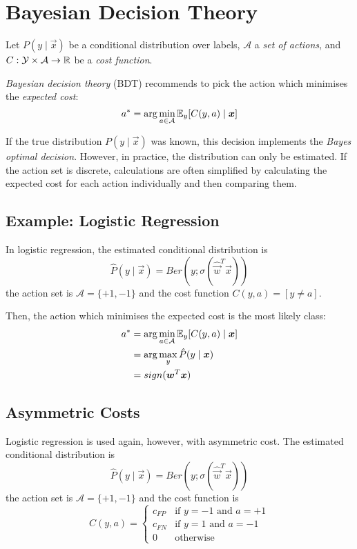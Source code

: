 \section{Bayesian Decision Theory}
Let $P(y \mid \vec{x})$ be a conditional
distribution over labels,
$\mathcal{A}$ a \emph{set of actions},
and $C : \mathcal{Y} \times \mathcal{A} \to \mathbb{R}$
be a \emph{cost function}.

\emph{Bayesian decision theory} (BDT)
recommends to
pick the action which minimises the
\emph{expected cost}:
\begin{equation*}
    a^* =
    \arg\min_{a \in \mathcal{A}}{
        \mathbb{E}_y[C(y, a) \mid \boldsymbol{x}]
    }
\end{equation*}

If the true distribution $P(y \mid \vec{x})$
was known, this decision implements the
\emph{Bayes optimal decision}.
However, in practice, the distribution
can only be estimated.
If the action set is discrete,
calculations are often simplified
by calculating the expected cost
for each action individually
and then comparing them.


\subsection{Example: Logistic Regression}
In logistic regression,
the estimated conditional distribution is
\begin{equation*}
    \hat{P}(y \mid \vec{x}) =
    Ber(y ; \sigma(\hat{\vec{w}}^T \vec{x}))
\end{equation*}
the action set is
$\mathcal{A} = \{+1, -1\}$ and
the cost function
$C(y, a) = [y \neq a]$.

Then, the action which minimises the
expected cost is the most likely class:
\begin{align*}
    a^* &=
    \arg\min_{a \in \mathcal{A}}{
        \mathbb{E}_y[C(y, a) \mid \boldsymbol{x}]
    } \\
    &= \arg\max_y{\hat{P}(y \mid \boldsymbol{x})} \\
    &= sign(\boldsymbol{w}^T \boldsymbol{x})
\end{align*}


\subsection{Asymmetric Costs}
Logistic regression is used again,
however, with asymmetric cost.
The estimated conditional distribution is
\begin{equation*}
    \hat{P}(y \mid \vec{x}) =
    Ber(y ; \sigma(\hat{\vec{w}}^T \vec{x}))
\end{equation*}
the action set is
$\mathcal{A} = \{+1, -1\}$ and
the cost function is
\begin{equation*}
    C(y, a) =
    \begin{cases}
        c_{FP} & \text{if $y = -1$ and $a = +1$} \\
        c_{FN} & \text{if $y = 1$ and $a = -1$} \\
        0 & \text{otherwise}
    \end{cases}
\end{equation*}

